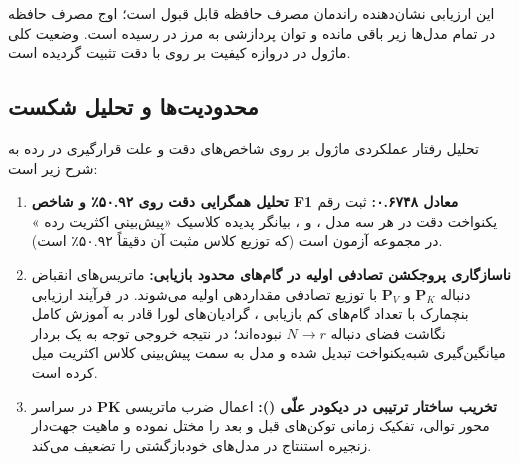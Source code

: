 این ارزیابی نشان‌دهنده راندمان مصرف حافظه قابل قبول است؛ اوج مصرف حافظه در تمام مدل‌ها زیر  باقی مانده و توان پردازشی به مرز  در  رسیده است. وضعیت کلی ماژول در دروازه کیفیت بر روی  با دقت  تثبیت گردیده است.

\subsection{محدودیت‌ها و تحلیل شکست}
تحلیل رفتار عملکردی ماژول بر روی شاخص‌های دقت و علت قرارگیری در رده  به شرح زیر است:
\begin{enumerate}
    \item \textbf{تحلیل همگرایی دقت روی ۵۰.۹۲٪ و شاخص F1 معادل ۰.۶۷۴۸:} ثبت رقم یکنواخت دقت  در هر سه مدل ،  و ، بیانگر پدیده کلاسیک «پیش‌بینی اکثریت رده » در مجموعه آزمون  است (که توزیع کلاس مثبت آن دقیقاً ۵۰.۹۲٪ است).
    \item \textbf{ناسازگاری پروجکشن تصادفی اولیه در گام‌های محدود بازیابی:} ماتریس‌های انقباض دنباله $\mathbf{P}_K$ و $\mathbf{P}_V$ با توزیع تصادفی مقداردهی اولیه می‌شوند. در فرآیند ارزیابی بنچمارک با تعداد گام‌های کم بازیابی ، گرادیان‌های لورا قادر به آموزش کامل نگاشت فضای دنباله $N \to r$ نبوده‌اند؛ در نتیجه خروجی توجه به یک بردار میانگین‌گیری شبه‌یکنواخت تبدیل شده و مدل به سمت پیش‌بینی کلاس اکثریت میل کرده است.
    \item \textbf{تخریب ساختار ترتیبی در دیکودر علّی ():} اعمال ضرب ماتریسی $\mathbf{P} \mathbf{K}$ در سراسر محور توالی، تفکیک زمانی توکن‌های قبل و بعد را مختل نموده و ماهیت جهت‌دار زنجیره استنتاج در مدل‌های خودبازگشتی را تضعیف می‌کند.
\end{enumerate}
